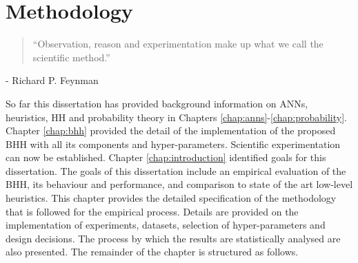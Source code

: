 \chapter{Methodology}\label{chap:methodology}

\begin{quotation}
      \noindent ``Observation, reason and experimentation make up what we call the scientific method.''
\end{quotation}
\begin{flushright}
      - Richard P. Feynman
\end{flushright}

\noindent
So far this dissertation has provided background information on \acfp{ANN}, heuristics, \acf{HH} and probability theory in Chapters \ref{chap:anns}-\ref{chap:probability}. Chapter \ref{chap:bhh} provided the detail of the implementation of the proposed \acs{BHH} with all its components and hyper-parameters. Scientific experimentation can now be established. Chapter \ref{chap:introduction} identified goals for this dissertation. The goals of this dissertation include an empirical evaluation of the \acs{BHH}, its behaviour and performance, and comparison to state of the art low-level heuristics. This chapter provides the detailed specification of the methodology that is followed for the empirical process. Details are provided on the implementation of experiments, datasets, selection of hyper-parameters and design decisions. The process by which the results are statistically analysed are also presented. The remainder of the chapter is structured as follows.


